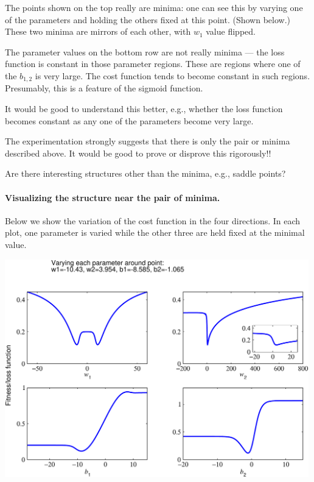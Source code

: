 \documentclass[12pt,a4paper]{article}
\begin{document}
The points shown on the top really are minima: one can see this by varying one of the parameters and
holding the others fixed at this point.  (Shown below.)  These two minima are mirrors of each other,
with $w_1$ value flipped.

The parameter values on the bottom row are not really minima --- the loss function is constant in
those parameter regions.  These are regions where one of the $b_{1,2}$ is very large.  The cost
function tends to become constant in such regions.  Presumably, this is a feature of the sigmoid
function.  

It would be good to understand this better, e.g., whether the loss function becomes constant as any
one of the parameters become very large.

The experimentation strongly suggests that there is only the pair or minima described above.  It
would be good to prove or disprove this rigorously!!   

Are there interesting structures other than the minima, e.g., saddle points?  



\paragraph{Visualizing the structure near the pair of minima.}

Below we show the variation of the cost function in the four directions.  In each plot, one
parameter is varied while the other three are held fixed at the minimal value.

\smallskip

\begin{center}
\includegraphics[width=0.99\textwidth]{Images/3node_largedomain_fitness_a_01}
\end{center}
\end{document}

